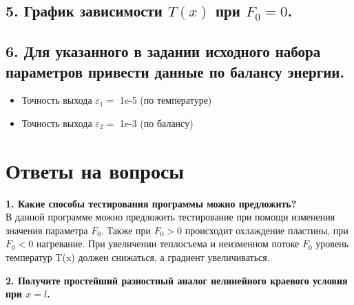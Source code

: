 \documentclass[a4paper,oneside,12pt]{extreport}
\begin{document}
\newpage

\subsection{5. График зависимости $T(x)$ при $F_{0} = 0$.}

\begin{figure}[ht!]
\end{figure}

\subsection{6. Для указанного в задании исходного набора параметров привести данные по балансу энергии.}

\begin{itemize}
	\item Точность выхода $\varepsilon_{1} = $ 1e-5 (по температуре)
	\item Точность выхода $\varepsilon_{2} = $ 1e-3 (по балансу)
\end{itemize}


\newpage
\section{Ответы на вопросы}

\textbf{1. Какие способы тестирования программы можно предложить?}\\

В данной программе можно предложить тестирование при помощи изменения значения параметра 
$F_0$. Также при $F_0 > 0$ происходит охлаждение пластины, при $F_0 < 0$ нагревание. При увеличении теплосъема и неизменном потоке
$F_0$ уровень температур T(x) должен снижаться, а градиент увеличиваться.


\textbf{2. Получите  простейший разностный аналог нелинейного краевого условия при $x = l$.}\\
\end{document}
